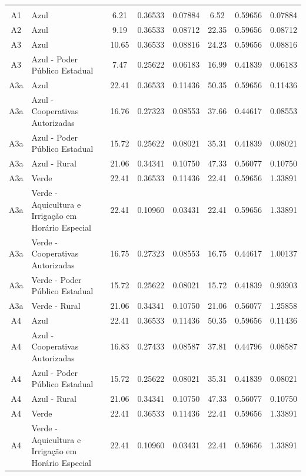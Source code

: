 \documentclass[grad,numbers]{coppe}
\begin{document}
\begin{longtable}[t]{c>{\centering\arraybackslash}p{8em}cccccc}
  \endfoot
  \bottomrule
  \multicolumn{8}{l}{\rule{0pt}{1em}\textit{Nota: } Demanda e consumo medidos, respectivamente, em R\$/kW e R\$/kWh.}\\
  \endlastfoot
  A1 & Azul & 6.21 & 0.36533 & 0.07884 & 6.52 & 0.59656 & 0.07884\\
  A2 & Azul & 9.19 & 0.36533 & 0.08712 & 22.35 & 0.59656 & 0.08712\\
  A3 & Azul & 10.65 & 0.36533 & 0.08816 & 24.23 & 0.59656 & 0.08816\\
  A3 & Azul - Poder Público Estadual & 7.47 & 0.25622 & 0.06183 & 16.99 & 0.41839 & 0.06183\\
  A3a & Azul & 22.41 & 0.36533 & 0.11436 & 50.35 & 0.59656 & 0.11436\\
  \addlinespace
  A3a & Azul - Cooperativas Autorizadas & 16.76 & 0.27323 & 0.08553 & 37.66 & 0.44617 & 0.08553\\
  A3a & Azul - Poder Público Estadual & 15.72 & 0.25622 & 0.08021 & 35.31 & 0.41839 & 0.08021\\
  A3a & Azul - Rural & 21.06 & 0.34341 & 0.10750 & 47.33 & 0.56077 & 0.10750\\
  A3a & Verde & 22.41 & 0.36533 & 0.11436 & 22.41 & 0.59656 & 1.33891\\
  A3a & Verde - Aquicultura e Irrigação em Horário Especial & 22.41 & 0.10960 & 0.03431 & 22.41 & 0.59656 & 1.33891\\
  \addlinespace
  A3a & Verde - Cooperativas Autorizadas & 16.75 & 0.27323 & 0.08553 & 16.75 & 0.44617 & 1.00137\\
  A3a & Verde - Poder Público Estadual & 15.72 & 0.25622 & 0.08021 & 15.72 & 0.41839 & 0.93903\\
  A3a & Verde - Rural & 21.06 & 0.34341 & 0.10750 & 21.06 & 0.56077 & 1.25858\\
  A4 & Azul & 22.41 & 0.36533 & 0.11436 & 50.35 & 0.59656 & 0.11436\\
  A4 & Azul - Cooperativas Autorizadas & 16.83 & 0.27433 & 0.08587 & 37.81 & 0.44796 & 0.08587\\
  \addlinespace
  A4 & Azul - Poder Público Estadual & 15.72 & 0.25622 & 0.08021 & 35.31 & 0.41839 & 0.08021\\
  A4 & Azul - Rural & 21.06 & 0.34341 & 0.10750 & 47.33 & 0.56077 & 0.10750\\
  A4 & Verde & 22.41 & 0.36533 & 0.11436 & 22.41 & 0.59656 & 1.33891\\
  A4 & Verde - Aquicultura e Irrigação em Horário Especial & 22.41 & 0.10960 & 0.03431 & 22.41 & 0.59656 & 1.33891\\

\end{longtable}
\end{document}
